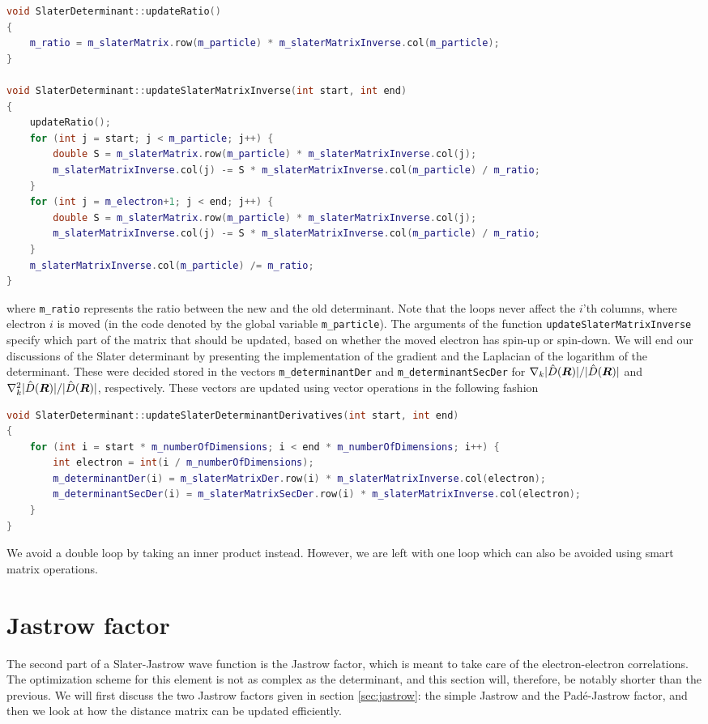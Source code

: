 \begin{lstlisting}[language={c++}]
void SlaterDeterminant::updateRatio()
{
	m_ratio = m_slaterMatrix.row(m_particle) * m_slaterMatrixInverse.col(m_particle);
}

void SlaterDeterminant::updateSlaterMatrixInverse(int start, int end)
{
	updateRatio();
	for (int j = start; j < m_particle; j++) {
		double S = m_slaterMatrix.row(m_particle) * m_slaterMatrixInverse.col(j);
		m_slaterMatrixInverse.col(j) -= S * m_slaterMatrixInverse.col(m_particle) / m_ratio;
	}
	for (int j = m_electron+1; j < end; j++) {
		double S = m_slaterMatrix.row(m_particle) * m_slaterMatrixInverse.col(j);
		m_slaterMatrixInverse.col(j) -= S * m_slaterMatrixInverse.col(m_particle) / m_ratio;
	}
	m_slaterMatrixInverse.col(m_particle) /= m_ratio;
}
\end{lstlisting}
where \lstinline{m_ratio} represents the ratio between the new and the old determinant. Note that the loops never affect the $i$'th columns, where electron $i$ is moved (in the code denoted by the global variable \lstinline{m_particle}). The arguments of the function \lstinline{updateSlaterMatrixInverse} specify which part of the matrix that should be updated, based on whether the moved electron has spin-up or spin-down. We will end our discussions of the Slater determinant by presenting the implementation of the gradient and the Laplacian of the logarithm of the determinant. These were decided stored in the vectors \lstinline{m_determinantDer} and \lstinline{m_determinantSecDer} for $\nabla_k|\hat{D}(\boldsymbol{{R}})|/|\hat{D}(\boldsymbol{{R}})|$ and $\nabla_k^2|\hat{D}(\boldsymbol{{R}})|/|\hat{D}(\boldsymbol{{R}})|$, respectively. These vectors are updated using vector operations in the following fashion
\begin{lstlisting}[language={c++}]
void SlaterDeterminant::updateSlaterDeterminantDerivatives(int start, int end)
{
	for (int i = start * m_numberOfDimensions; i < end * m_numberOfDimensions; i++) {
		int electron = int(i / m_numberOfDimensions);
		m_determinantDer(i) = m_slaterMatrixDer.row(i) * m_slaterMatrixInverse.col(electron);
		m_determinantSecDer(i) = m_slaterMatrixSecDer.row(i) * m_slaterMatrixInverse.col(electron);
	}
}
\end{lstlisting}
We avoid a double loop by taking an inner product instead. However, we are left with one loop which can also be avoided using smart matrix operations.

\section{Jastrow factor}
The second part of a Slater-Jastrow wave function is the Jastrow factor, which is meant to take care of the electron-electron correlations. The optimization scheme for this element is not as complex as the determinant, and this section will, therefore, be notably shorter than the previous. We will first discuss the two Jastrow factors given in section \ref{sec:jastrow}: the simple Jastrow and the Padé-Jastrow factor, and then we look at how the distance matrix can be updated efficiently. 

